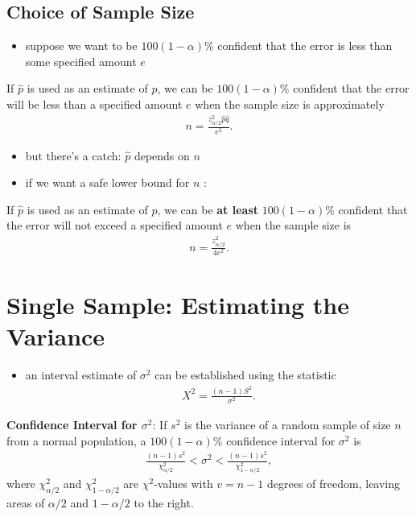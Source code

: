 \documentclass[10pt]{article}
\begin{document}
\subsection{Choice of Sample Size}
\begin{itemize}
    \item suppose we want to be $100(1-\alpha)\%$ confident that the error is less than some specified amount $e$
\end{itemize}
\begin{theorem}
    If $\hat{p}$ is used as an estimate of $p$, we can be $100(1-\alpha)\%$ confident that the error will be less than a specified amount $e$ when the sample size is approximately 
    \begin{gather*}
        n = \frac{z_{\alpha / 2}^2 \hat{p} \hat{q}}{e^2}
    .\end{gather*}
\end{theorem}
\begin{itemize}
    \item but there's a catch: $\hat{p}$ depends on $n$
    \item if we want a safe lower bound for  $n$ :
\end{itemize}
\begin{theorem}
    If $\hat{p}$ is used as an estimate of $p$, we can be \textbf{at least} $100(1-\alpha)\%$ confident that the error will not exceed a specified amount $e$ when the sample size is 
    \begin{gather*}
        n = \frac{z_{\alpha / 2}^2}{4e^2}
    .\end{gather*}
\end{theorem}


\section{Single Sample: Estimating the Variance}
\begin{itemize}
    \item an interval estimate of $\sigma^2$ can be established using the statistic 
        \begin{gather*}
            X^2 = \frac{(n-1)S^2}{\sigma^2}
        .\end{gather*}
\end{itemize}
\begin{theorem}
    \textbf{Confidence Interval for $\sigma^2$}: If $s^2$ is the variance of a random sample of size $n$ from a normal population, a $100(1-\alpha)\%$ confidence interval for $\sigma^2$ is 
    \begin{gather*}
        \frac{(n-1)s^2}{\chi_{\alpha / 2}^2} < \sigma^2 < \frac{(n-1)s^2}{\chi_{1-\alpha / 2}^2}
    ,\end{gather*}
    where $ \chi_{\alpha / 2}^2$ and $ \chi_{1-\alpha / 2}^2$ are $\chi^2$-values with $v=n-1$ degrees of freedom, leaving areas of $\alpha / 2$ and $1-\alpha/2$ to the right.
\end{theorem}
\end{document}
